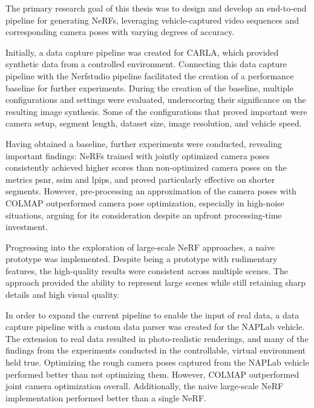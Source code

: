 

The primary research goal of this thesis was to design and develop an end-to-end pipeline for generating NeRFs, leveraging vehicle-captured video sequences and corresponding camera poses with varying degrees of accuracy.

Initially, a data capture pipeline was created for CARLA, which provided synthetic data from a controlled environment. Connecting this data capture pipeline with the Nerfstudio pipeline facilitated the creation of a performance baseline for further experiments. During the creation of the baseline, multiple configurations and settings were evaluated, underscoring their significance on the resulting image synthesis. Some of the configurations that proved important were camera setup, segment length, dataset size, image resolution, and vehicle speed.

Having obtained a baseline, further experiments were conducted, revealing important findings: NeRFs trained with jointly optimized camera poses consistently achieved higher scores than non-optimized camera poses on the metrics \acrshort{psnr}, \acrshort{ssim} and \acrshort{lpips}, and proved particularly effective on shorter segments. However, pre-processing an approximation of the camera poses with COLMAP outperformed camera pose optimization, especially in high-noise situations, arguing for its consideration despite an upfront processing-time investment.

Progressing into the exploration of large-scale NeRF approaches, a naive prototype was implemented. Despite being a prototype with rudimentary features, the high-quality results were consistent across multiple scenes. The approach provided the ability to represent large scenes while still retaining sharp details and high visual quality.

In order to expand the current pipeline to enable the input of real data, a data capture pipeline with a custom data parser was created for the NAPLab vehicle. The extension to real data resulted in photo-realistic renderings, and many of the findings from the experiments conducted in the controllable, virtual environment held true. Optimizing the rough camera poses captured from the NAPLab vehicle performed better than not optimizing them. However, COLMAP outperformed joint camera optimization overall. Additionally, the naive large-scale NeRF implementation performed better than a single NeRF.

